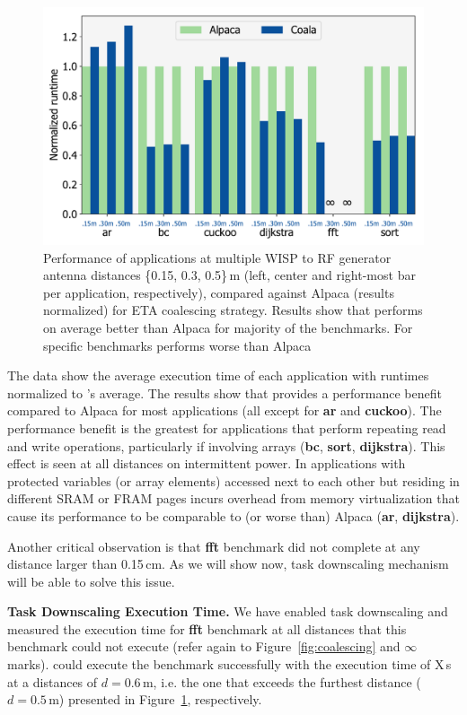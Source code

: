 \begin{figure}
	\centering
	\includegraphics[width=0.5\columnwidth]{figures/coala_alpaca_gcc}
	\caption{Performance of \sys applications at multiple WISP to RF generator antenna distances \{0.15, 0.3, 0.5\}\,m (left, center and right-most bar per application, respectively), compared against Alpaca (results normalized) for ETA coalescing strategy. Results show that \sys performs on average better than Alpaca for majority of the benchmarks. For specific benchmarks \sys performs worse than Alpaca }
	\label{fig:runtime}
\end{figure}

The data show the average execution time of each application with runtimes normalized to \sys's average.  The results show that \sys provides a performance benefit compared to Alpaca for most applications (all except for \textbf{ar} and \textbf{cuckoo}). The performance benefit is the greatest for applications that perform repeating read and write operations, particularly if involving arrays (\textbf{bc}, \textbf{sort}, \textbf{dijkstra}). This effect is seen at all distances on intermittent power. In applications with protected variables (or array elements) accessed next to each other but residing in different SRAM or FRAM pages \sys incurs overhead from memory virtualization that cause its performance to be comparable to (or worse than) Alpaca (\textbf{ar}, \textbf{dijkstra}). 

Another critical observation is that \textbf{fft} benchmark did not complete at any distance larger than 0.15\,cm. As we will show now, \sys task downscaling mechanism will be able to solve this issue.  

\textbf{Task Downscaling Execution Time.} We have enabled task downscaling and measured the execution time for \textbf{fft} benchmark at all distances that this benchmark could not execute (refer again to Figure~\ref{fig:coalescing} and $\infty$ marks). \sys could execute the benchmark successfully with the execution time of X\,s at a distances of $d= 0.6$\,m, i.e. the one that exceeds the furthest distance ($d=0.5$\,m) presented in Figure~\ref{fig:runtime}, respectively.

